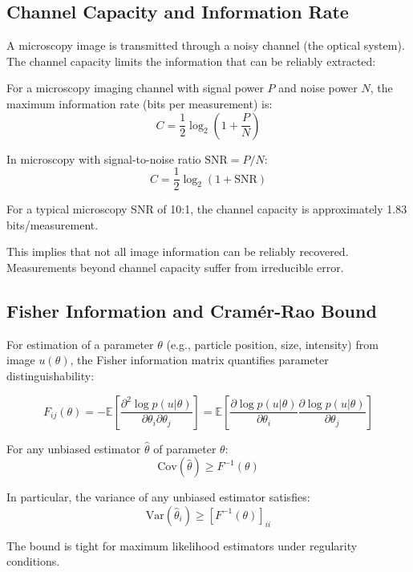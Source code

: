 \documentclass[twocolumn,11pt]{article}
\begin{document}
\subsection{Channel Capacity and Information Rate}

A microscopy image is transmitted through a noisy channel (the optical system). The channel capacity limits the information that can be reliably extracted:

\begin{theorem}
For a microscopy imaging channel with signal power $P$ and noise power $N$, the maximum information rate (bits per measurement) is:
\begin{equation}
C = \frac{1}{2} \log_2\left(1 + \frac{P}{N}\right)
\end{equation}

In microscopy with signal-to-noise ratio $\text{SNR} = P/N$:
\begin{equation}
C = \frac{1}{2} \log_2(1 + \text{SNR})
\end{equation}

For a typical microscopy SNR of 10:1, the channel capacity is approximately 1.83 bits/measurement.
\end{theorem}

This implies that not all image information can be reliably recovered. Measurements beyond channel capacity suffer from irreducible error.

\subsection{Fisher Information and Cramér-Rao Bound}

For estimation of a parameter $\theta$ (e.g., particle position, size, intensity) from image $u(\theta)$, the Fisher information matrix quantifies parameter distinguishability:

\begin{definition}
\begin{equation}
F_{ij}(\theta) = -\mathbb{E}\left[ \frac{\partial^2 \log p(u | \theta)}{\partial \theta_i \partial \theta_j} \right] = \mathbb{E}\left[ \frac{\partial \log p(u|\theta)}{\partial \theta_i} \frac{\partial \log p(u|\theta)}{\partial \theta_j} \right]
\end{equation}
\end{definition}

\begin{theorem}
For any unbiased estimator $\hat{\theta}$ of parameter $\theta$:
\begin{equation}
\text{Cov}(\hat{\theta}) \geq F^{-1}(\theta)
\end{equation}

In particular, the variance of any unbiased estimator satisfies:
\begin{equation}
\text{Var}(\hat{\theta}_i) \geq [F^{-1}(\theta)]_{ii}
\end{equation}

The bound is tight for maximum likelihood estimators under regularity conditions.
\end{theorem}
\end{document}
